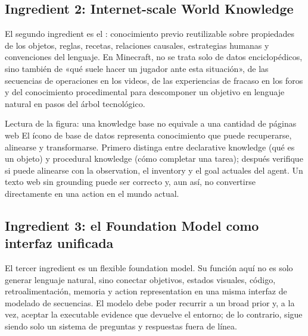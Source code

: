 \subsection{Ingredient 2: Internet-scale World Knowledge}

El segundo ingredient es el : conocimiento previo reutilizable sobre propiedades de los objetos, reglas, recetas, relaciones causales, estrategias humanas y convenciones del lenguaje. En Minecraft, no se trata solo de datos enciclopédicos, sino también de «qué suele hacer un jugador ante esta situación», de las secuencias de operaciones en los videos, de las experiencias de fracaso en los foros y del conocimiento procedimental para descomponer un objetivo en lenguaje natural en pasos del árbol tecnológico.


\begin{knowledgebox}{Lectura de la figura: una knowledge base no equivale a una cantidad de páginas web}
El ícono de base de datos representa conocimiento que puede recuperarse, alinearse y transformarse. Primero distinga entre declarative knowledge (qué es un objeto) y procedural knowledge (cómo completar una tarea); después verifique si puede alinearse con la observation, el inventory y el goal actuales del agent. Un texto web sin grounding puede ser correcto y, aun así, no convertirse directamente en una action en el mundo actual.
\end{knowledgebox}

\subsection{Ingredient 3: el Foundation Model como interfaz unificada}

El tercer ingredient es un flexible foundation model. Su función aquí no es solo generar lenguaje natural, sino conectar objetivos, estados visuales, código, retroalimentación, memoria y action representation en una misma interfaz de modelado de secuencias. El modelo debe poder recurrir a un broad prior y, a la vez, aceptar la executable evidence que devuelve el entorno; de lo contrario, sigue siendo solo un sistema de preguntas y respuestas fuera de línea.


